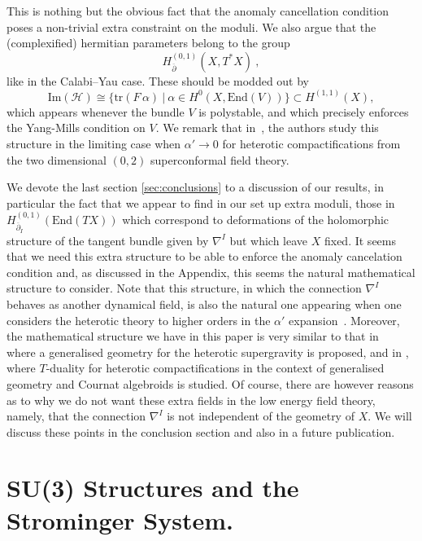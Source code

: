 \documentclass[12pt,a4paper]{article}
\def\bar#1{\overline{#1}}
\def\to{\rightarrow}
\def\End{\textrm{End}}
\def\bp{\bar{\partial}}
\def\tr{\textrm{tr}}
\def\H{\mathcal{H}}
\def\H{\mathcal{H}}
\theoremstyle{definition}
\begin{document}
This is nothing but the obvious fact that the anomaly cancellation condition poses a non-trivial extra constraint on the moduli.  We also argue that
the (complexified) hermitian parameters belong to the group
\begin{equation*}
H^{(0,1)}_{\bp}(X,T^*X)\:,
\end{equation*}
like in the Calabi--Yau case.  These should be modded out by 
\[\textrm{Im}(\H)\cong\{\tr(F\,\alpha)\:\vert\:\alpha\in H^0(X,\End(V))\}\subset H^{(1,1)}(X),\] 
which appears whenever the bundle $V$ is polystable, and which precisely enforces the Yang-Mills condition on $V$. We remark that in~\citep{Melnikov:2011ez}, the authors study this structure in the limiting case when
$\alpha'\to 0$ for heterotic compactifications from the two dimensional $(0,2)$ superconformal field theory.

We devote the last section \ref{sec:conclusions} to a discussion of our results, in particular the fact that we appear to find in our set up extra moduli, those in $H^{(0,1)}_{\bp_I}(\End(TX))$ which correspond to deformations of the holomorphic structure of the tangent bundle given by $\nabla^I$ but which leave $X$ fixed.  It seems that we need this extra structure to be able to enforce the anomaly cancelation condition and, as discussed in the Appendix, this seems the natural mathematical structure to consider.  Note that this structure, in which the connection $\nabla^I$ behaves as another dynamical field,  is also the natural one appearing when one considers the heterotic theory to 
higher orders in the $\alpha'$ expansion~\citep{delaossa2014}.  Moreover, the mathematical structure we have in this paper is very similar to that in~\citep{2013arXiv1304.4294G} where a generalised geometry for the heterotic supergravity is proposed, and in \citep{2013arXiv1308.5159B}, where $T$-duality for heterotic compactifications in the context of generalised geometry and Cournat algebroids is studied.
Of course, there are however reasons as to why we do not want these extra fields in the low energy field theory, namely, that the connection $\nabla^I$ is not independent of the geometry of $X$.  We will discuss these points in the conclusion section and also in a future publication.



\newpage

\section{SU(3) Structures and the Strominger System.}
\label{sec:hetcomp}
\end{document}
